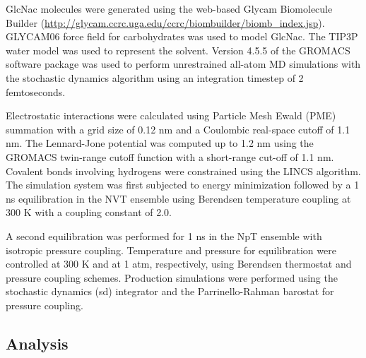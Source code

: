 GlcNac molecules were generated using the web-based Glycam Biomolecule Builder (\url{http://glycam.ccrc.uga.edu/ccrc/biombuilder/biomb_index.jsp}). GLYCAM06 force field for carbohydrates was used to model GlcNac. The TIP3P water model was used to represent the solvent. Version 4.5.5 of the GROMACS software package was used to perform unrestrained all-atom MD simulations with the stochastic dynamics algorithm using an integration timestep of 2 femtoseconds.

Electrostatic interactions were calculated using Particle Mesh Ewald (PME) summation with a grid size of 0.12 nm and a Coulombic real-space cutoff of 1.1 nm. The Lennard-Jone potential was computed up to 1.2 nm using the GROMACS twin-range cutoff function with a short-range cut-off of 1.1 nm. Covalent bonds involving hydrogens were constrained using the LINCS algorithm. The simulation system was first subjected to energy minimization followed by a 1 ns equilibration in the NVT ensemble using Berendsen temperature coupling at 300 K with a coupling constant of 2.0.

A second equilibration was performed for 1 ns in the NpT ensemble with isotropic pressure coupling. Temperature and pressure for equilibration were controlled at 300 K and at 1 atm, respectively, using Berendsen thermostat and pressure coupling schemes. Production simulations were performed using the stochastic dynamics (sd) integrator and the Parrinello-Rahman barostat for pressure coupling.

\subsection{Analysis}

